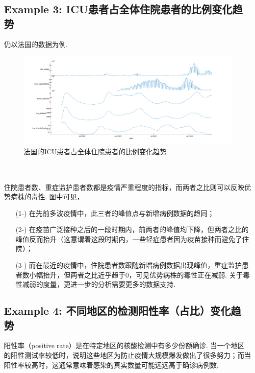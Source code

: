 \documentclass[a4paper, titlepage]{article}
\begin{document}
    \subsection{Example 3: ICU患者占全体住院患者的比例变化趋势}
    仍以法国的数据为例. \\
    \begin{minipage}{\textwidth}
        \begin{figure}[H]
            \centering
            \includegraphics[width=\textwidth]{./images/France_ICU_Hospital.png}
            \vspace{-2em}
            \caption{法国的ICU患者占全体住院患者的比例变化趋势}
            \label{images:France_ICU_Hospital}
        \end{figure}
    \end{minipage}\\\quad\\
    住院患者数、重症监护患者数都是疫情严重程度的指标，而两者之比则可以反映优势病株的毒性. 图中可见，
    \begin{enumerate}
        \item [(1-)] 在先前多波疫情中，此三者的峰值点与新增病例数据的趋同；
        \item [(2-)] 在疫苗广泛接种之后的一段时期内，前两者的峰值均下降，但两者之比的峰值反而抬升（{\kaishu 这意谓着这段时期内，一些轻症患者因为疫苗接种而避免了住院}）；
        \item [(3-)] 而在最近的疫情中，住院患者数跟随新增病例数据出现峰值，重症监护患者数小幅抬升，但两者之比近乎趋于$0$，可见优势病株的毒性正在减弱. 关于毒性减弱的度量，更进一步的分析需要更多的数据支持.
    \end{enumerate}
    \subsection{Example 4: 不同地区的检测阳性率（占比）变化趋势}
    阳性率（positive rate）是在特定地区的核酸检测中有多少份额确诊. 当一个地区的阳性测试率较低时，说明这些地区为防止疫情大规模爆发做出了很多努力；而当阳性率较高时，这通常意味着感染的真实数量可能远远高于确诊病例数.
\end{document}

